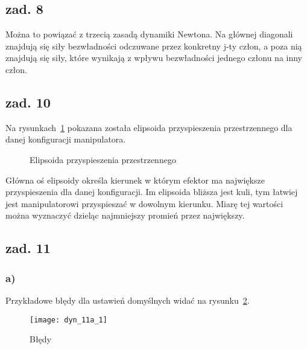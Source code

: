 \documentclass[11pt, a4paper]{article}
\begin{document}
\subsection*{zad. 8}

Można to powiązać z trzecią zasadą dynamiki Newtona. Na głównej diagonali znajdują się siły bezwładności odczuwane przez konkretny j-ty człon, a poza nią znajdują się siły, które wynikają z wpływu bezwładności jednego członu na inny człon.


\subsection*{zad. 10}
Na rysunkach~\ref{fig:dyn_10} pokazana została elipsoida przyspieszenia przestrzennego dla danej konfiguracji manipulatora.
\begin{figure}[htbp!]
	\centering
	
	\hfill%
	\hfill%

	\caption{Elipsoida przyspieszenia przestrzennego \label{fig:dyn_10}}
\end{figure}

Główna oś elipsoidy określa kierunek w którym efektor ma największe przyspieszenia dla danej konfiguracji. Im elipsoida bliższa jest kuli, tym łatwiej jest manipulatorowi przyspieszać w dowolnym kierunku. Miarę tej wartości można wyznaczyć dzieląc najmniejszy promień przez największy.

\subsection*{zad. 11}

\subsubsection*{a)}

Przykładowe błędy dla ustawień domyślnych widać na rysunku~\ref{fig:dyn_11a}.
\begin{figure}[htbp!]
	\centering
	\texttt{[image: dyn\_11a\_1]}
	\caption{Błędy \label{fig:dyn_11a}}
\end{figure}
\end{document}

